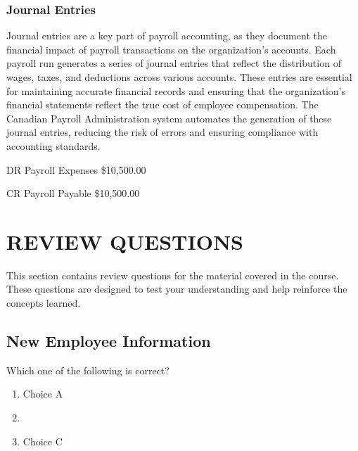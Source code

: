 \documentclass[letterpaper,10pt,english]{sphinxmanual}
\begin{document}
\subsection{Journal Entries}
\label{\detokenize{payroll_accounting:id1}}
\sphinxAtStartPar
Journal entries are a key part of payroll accounting, as they document the financial impact of payroll transactions on the organization’s accounts. Each payroll run generates a series of journal entries that reflect the distribution of wages, taxes, and deductions across various accounts.
These entries are essential for maintaining accurate financial records and ensuring that the organization’s financial statements reflect the true cost of employee compensation. The Canadian Payroll Administration system automates the generation of these journal entries, reducing the risk of errors and ensuring compliance with accounting standards.

\begin{DUlineblock}{0em}
\item[] DR    Payroll Expenses    \$10,500.00
\item[]
\begin{DUlineblock}{\DUlineblockindent}
\item[] CR  Payroll Payable   \$10,500.00
\end{DUlineblock}
\end{DUlineblock}

\sphinxstepscope


\chapter{REVIEW QUESTIONS}
\label{\detokenize{review_questions:review-questions}}\label{\detokenize{review_questions::doc}}
\sphinxAtStartPar
This section contains review questions for the material covered in the course. These questions are designed to test your understanding and help reinforce the concepts learned.


\section{New Employee Information}
\label{\detokenize{review_questions:new-employee-information}}
\sphinxAtStartPar
Which one of the following is correct?
\begin{enumerate}
%
\item {} 
\sphinxAtStartPar
Choice A

\item {} 
\sphinxAtStartPar
{}

\item {} 
\sphinxAtStartPar
Choice C

\end{enumerate}
\end{document}
